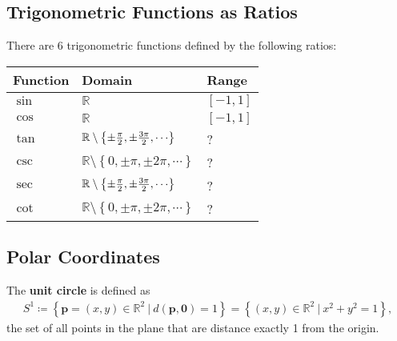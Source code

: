 \hypertarget{trigonometric-functions-as-ratios}{%
\subsection{Trigonometric Functions as
Ratios}\label{trigonometric-functions-as-ratios}}

\begin{definition}[?]

There are 6 trigonometric functions defined by the following ratios:


\end{definition}

\begin{proposition}

\begin{longtable}[]{@{}
  >{\raggedright\arraybackslash}p{}
  >{\raggedright\arraybackslash}p{}
  >{\raggedright\arraybackslash}p{}@{}}
\toprule
Function & Domain & Range \\
\midrule
\endhead
\(\sin\) & \({\mathbb{R}}\) & \([-1, 1]\) \\
\(\cos\) & \({\mathbb{R}}\) & \([-1, 1]\) \\
\(\tan\) &
\({\mathbb{R}}\setminus\left\{{\pm {\pi \over 2}, \pm{3\pi \over 2}, \cdots}\right\}\)
& ? \\
\(\csc\) &
\({\mathbb{R}}\setminus\left\{{0, \pm {\pi}, \pm{2\pi}, \cdots}\right\}\)
& ? \\
\(\sec\) &
\({\mathbb{R}}\setminus\left\{{\pm {\pi \over 2}, \pm{3\pi \over 2}, \cdots}\right\}\)
& ? \\
\(\cot\) &
\({\mathbb{R}}\setminus\left\{{0, \pm {\pi}, \pm{2\pi}, \cdots}\right\}\)
& ? \\
\bottomrule
\end{longtable}

\end{proposition}

\hypertarget{polar-coordinates}{%
\subsection{Polar Coordinates}\label{polar-coordinates}}

\begin{definition}

The \textbf{unit circle} is defined as
\begin{align*}
S^1 \coloneqq\left\{{ \mathbf{p} = (x, y) \in {\mathbb{R}}^2 {~\mathrel{\Big|}~}d(\mathbf{p}, \mathbf{0}) = 1 }\right\} = \left\{{ (x, y) \in {\mathbb{R}}^2 {~\mathrel{\Big|}~}x^2 + y^2 = 1 }\right\} 
,\end{align*}
the set of all points in the plane that are distance exactly 1 from the
origin.

\end{definition}

